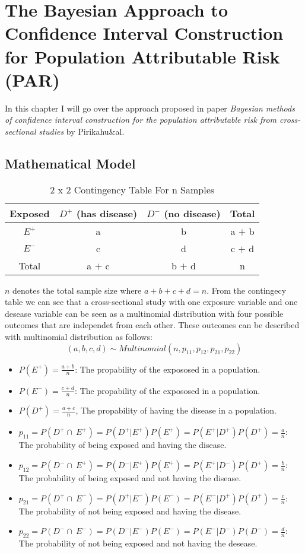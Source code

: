 \chapter{The Bayesian Approach to Confidence Interval Construction for Population Attributable Risk (PAR)} \label{bayesian-model}
In this chapter I will go over the approach proposed in paper \textit{Bayesian methods of confidence interval construction for the population attributable risk from cross-sectional studies} by Pirikahu\&al. 

\section{Mathematical Model} \label{PiriMath}
\begin{table}[h!]
\centering
\caption{2 x 2 Contingency Table For n Samples}
\label{contingency-table}
\begin{tabular}{|c|c|c|c|}
\hline
Exposed & $D^+$ (has disease) & $D^-$ (no disease) & Total \\ \hline
$E^+$ & a & b & a $+$ b \\ \hline
$E^-$ & c & d & c $+$ d \\ \hline
Total & a $+$ c & b $+$ d & n \\ \hline
\end{tabular}
\end{table}

$n$ denotes the total sample size where $a + b + c + d = n$. From the contingecy table we can see that a cross-sectional study with one exposure variable and one desease variable can be seen as a multinomial distribution with four possible outcomes that are independet from each other. These outcomes can be described with multinomial distribution as follows:
\begin{equation} \label{multinomial}
(a, b, c, d) \sim Multinomial(n, p_{11}, p_{12}, p_{21}, p_{22})
\end{equation}

\begin{itemize}
    \item $P(E^+) = \frac{a + b}{n}$: The propability of the expososed in a population.
    \item $P(E^-) = \frac{c + d}{n}$: The propability of the expososed in a population.
    \item $P(D^+) = \frac{a + c}{n}$, The propability of having the disease in a population.
    \item $p_{11} = P(D^+ \cap\ E^+) = P(D^+ | E^+)P(E^+) = P(E^+ | D^+)P(D^+) = \frac{a}{n}$: The probability of being exposed and having the disease.
    \item $p_{12} = P(D^- \cap\ E^+) = P(D^- | E^+)P(E^+) = P(E^+ | D^-)P(D^+) = \frac{b}{n}$: The probability of being exposed and not having the disease.
    \item $p_{21} = P(D^+ \cap\ E^-) = P(D^+ | E^-)P(E^-) = P(E^- | D^+)P(D^+) = \frac{c}{n}$: The probability of not being exposed and having the disease.
    \item $p_{22} = P(D^- \cap\ E^-) = P(D^- | E^-)P(E^-) = P(E^- | D^-)P(D^-) = \frac{d}{n}$: The probability of not being exposed and not having the desease.
\end{itemize}

